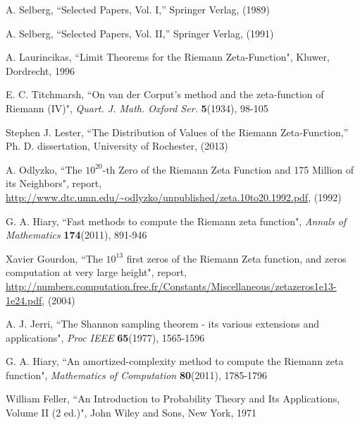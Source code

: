 \documentclass[twoside]{article}
\begin{document}
\begin{thebibliography}{10}
 A. Selberg, ``Selected Papers, Vol. I,''
Springer Verlag,  (1989)

 A. Selberg, ``Selected Papers, Vol. II,''
Springer Verlag,  (1991)



 A. Laurincikas,
``Limit Theorems for the Riemann Zeta-Function",
Kluwer, Dordrecht, 1996

 E. C. Titchmarsh,
``On van der Corput's method and the zeta-function of Riemann (IV)",
{\it Quart. J. Math. Oxford Ser.} {\bf5}(1934), 98-105

 Stephen J. Lester, ``The Distribution of Values of the
Riemann Zeta-Function,''
Ph. D. dissertation, University of Rochester,  (2013)

  A. Odlyzko,
``The $10^{20}$-th Zero of the Riemann Zeta
Function and 175 Million of its Neighbors", report,
\url{http://www.dtc.umn.edu/~odlyzko/unpublished/zeta.10to20.1992.pdf}, (1992)

 G. A. Hiary,
``Fast methods to compute the Riemann zeta function",
{\it Annals of Mathematics} {\bf174}(2011), 891-946

 Xavier Gourdon,
``The $10^{13}$ first zeros of the Riemann Zeta function,
and zeros computation at very large height", report,
\url{http://numbers.computation.free.fr/Constants/Miscellaneous/zetazeros1e13-1e24.pdf}, (2004)

 A. J. Jerri,
``The Shannon sampling theorem - its various extensions and applications",
{\it Proc IEEE} {\bf65}(1977), 1565-1596

 G. A. Hiary,
``An amortized-complexity method to compute the Riemann zeta function", 
{\it Mathematics of Computation} {\bf80}(2011), 1785-1796

 William Feller,
``An Introduction to Probability Theory and Its Applications, Volume II (2 ed.)",
John Wiley and Sons, New York, 1971


\end{thebibliography} 
\end{document}
